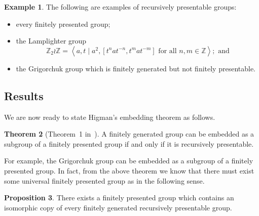 \documentclass[11pt,a4paper,reqno]{amsart}
\theoremstyle{plain}
\theoremstyle{definition}
\newtheorem{theorem}{Theorem}[section]
\newtheorem{proposition}[theorem]{Proposition}
\theoremstyle{definition}
\newtheorem{example}[theorem]{Example}
\begin{document}
\begin{example}
	The following are examples of recursively presentable groups:
	\begin{itemize}
		\item every finitely presented group;
		\item the Lamplighter group
		      \[
			      \mathbb Z_2 \wr \mathbb Z
			      =
			      \left\langle
			      a,t
			      \mid
			      a^2, [t^n a t^{-n}, t^m a t^{-m}]\text{ for all }n,m\in \mathbb Z
			      \right\rangle;\text{ and}
		      \]
		\item the Grigorchuk group which is finitely generated but not finitely presentable.
	\end{itemize}
\end{example}

\subsection{Results}
We are now ready to state Higman's embedding theorem as follows.

\begin{theorem}[Theorem~1 in~\cite{higman1961}]\label{thm:higman}
	A finitely generated group can be embedded as a subgroup of a finitely presented group if and only if it is recursively presentable.
\end{theorem}

For example, the Grigorchuk group can be embedded as a subgroup of a finitely presented group.
In fact, from the above theorem we know that there must exist some universal finitely presented group as in the following sense.

\begin{proposition}\label{lem:universal-pres}
	There exists a finitely presented group which contains an isomorphic copy of every finitely generated recursively presentable group.
\end{proposition}
\end{document}
